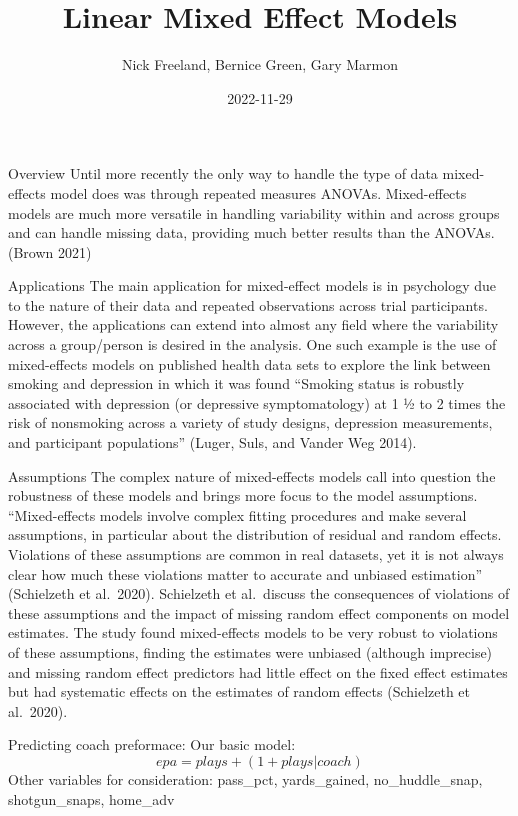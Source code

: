 \documentclass[
  ignorenonframetext,
]{beamer}
\title{Linear Mixed Effect Models}
\author{Nick Freeland, Bernice Green, Gary Marmon}
\date{2022-11-29}
\begin{document}
\frame{\titlepage}

\begin{frame}{Overview}
\protect\hypertarget{overview}{}
Until more recently the only way to handle the type of data
mixed-effects model does was through repeated measures ANOVAs.
Mixed-effects models are much more versatile in handling variability
within and across groups and can handle missing data, providing much
better results than the ANOVAs. (Brown 2021)
\end{frame}

\begin{frame}{Applications}
\protect\hypertarget{applications}{}
The main application for mixed-effect models is in psychology due to the
nature of their data and repeated observations across trial
participants. However, the applications can extend into almost any field
where the variability across a group/person is desired in the analysis.
One such example is the use of mixed-effects models on published health
data sets to explore the link between smoking and depression in which it
was found ``Smoking status is robustly associated with depression (or
depressive symptomatology) at 1 ½ to 2 times the risk of nonsmoking
across a variety of study designs, depression measurements, and
participant populations'' (Luger, Suls, and Vander Weg 2014).
\end{frame}

\begin{frame}{Assumptions}
\protect\hypertarget{assumptions}{}
The complex nature of mixed-effects models call into question the
robustness of these models and brings more focus to the model
assumptions. ``Mixed-effects models involve complex fitting procedures
and make several assumptions, in particular about the distribution of
residual and random effects. Violations of these assumptions are common
in real datasets, yet it is not always clear how much these violations
matter to accurate and unbiased estimation'' (Schielzeth et al.~2020).
Schielzeth et al.~discuss the consequences of violations of these
assumptions and the impact of missing random effect components on model
estimates. The study found mixed-effects models to be very robust to
violations of these assumptions, finding the estimates were unbiased
(although imprecise) and missing random effect predictors had little
effect on the fixed effect estimates but had systematic effects on the
estimates of random effects (Schielzeth et al.~2020).
\end{frame}

\begin{frame}{Predicting coach preformace:}
\protect\hypertarget{predicting-coach-preformace}{}
Our basic model: \[epa = plays +  (1+plays|coach)\] Other variables for
consideration: pass\_pct, yards\_gained, no\_huddle\_snap,
shotgun\_snaps, home\_adv
\end{frame}
\end{document}
